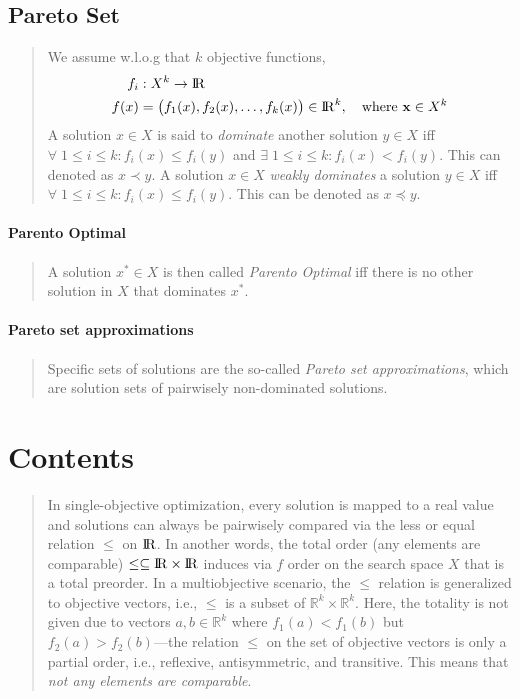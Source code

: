 \documentclass[a4paper, 11pt]{article}
\newcommand{\R}{{\rm I\!R}}
\begin{document}
\subsection{Pareto Set}
    \begin{quote}
        We assume w.l.o.g that $k$ objective functions,
        \begin{equation*}
            \begin{aligned}
                f_i&:X^k\rightarrow\R\\
                f(x) &= \bigl(f_1(x),f_2(x),\ldots,f_k(x)\bigr)\in\R^k,\quad\text{where }\mathbf{x}\in X^k
            \end{aligned} 
        \end{equation*}
        A solution $x\in X$  is said to \emph{dominate} another solution $y\in X$ iff $\forall\;1\leq i\leq k:f_i(x)\leq f_i(y)$ and $\exists\;1\leq i\leq k:f_i(x)<f_i(y)$. This can denoted as
        $x\prec y$. A solution $x\in X$ \emph{weakly dominates} a solution $y\in X$ iff $\forall\;1\leq i\leq k:f_i(x)\leq f_i(y)$. This can be denoted as
        $x\preceq y$.
    \end{quote}
    \paragraph{Parento Optimal}
        \begin{quote}
            A solution $x^*\in X$ is then called \emph{Parento Optimal} iff there is no other solution in $X$ that dominates $x^*$. 
        \end{quote}
    \paragraph{Pareto set approximations}
        \begin{quote}
            Specific sets of solutions are the so-called \emph{Pareto set approximations}, which are solution sets of pairwisely non-dominated solutions.
        \end{quote}
\section{Contents}  
    \begin{quote}
        In single-objective optimization, every solution is mapped to a real value and solutions can always be pairwisely compared via the less or equal 
        relation $\leq$ on $\R$. In another words, the total order (any elements are comparable) $\leq\subseteq\R\times\R$ induces via $f$ order on the 
        search space $X$ that is a total preorder. In a multiobjective scenario, the $\le$ relation is generalized to objective vectors, i.e., $\le$ is 
        a subset of $\mathbb{R}^k \times \mathbb{R}^k$. Here, the totality is not given due to vectors $a, b \in \mathbb{R}^k$ where $f_1(a) < f_1(b)$ 
        but $f_2(a) > f_2(b)$—the relation $\le$ on the set of objective vectors is only a partial order, i.e., reflexive, antisymmetric, and transitive. 
        This means that \emph{not any elements are comparable}.
    \end{quote}
\end{document}
